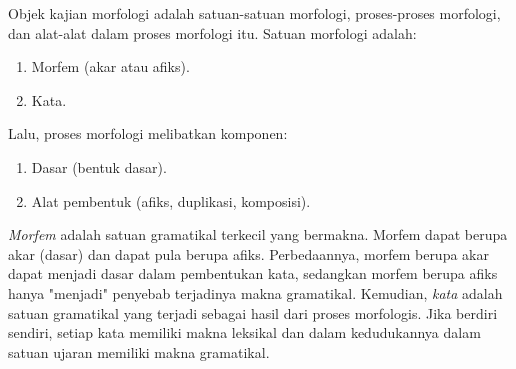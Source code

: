%
%
%
%
%
%
%
%

Objek kajian morfologi adalah satuan-satuan morfologi, proses-proses morfologi, dan alat-alat dalam proses morfologi itu\cite{chaer:08:morfologi}. Satuan morfologi adalah:

\begin{enumerate}
	\item Morfem (akar atau afiks).
	\item Kata.
\end{enumerate}

Lalu, proses morfologi melibatkan komponen:

\begin{enumerate}
	\item Dasar (bentuk dasar).
	\item Alat pembentuk (afiks, duplikasi, komposisi).
\end{enumerate}

\textit{Morfem} adalah satuan gramatikal terkecil yang bermakna. Morfem dapat berupa akar (dasar) dan dapat pula berupa afiks. Perbedaannya, morfem berupa akar dapat menjadi dasar dalam pembentukan kata, sedangkan morfem berupa afiks hanya "menjadi" penyebab terjadinya makna gramatikal. Kemudian, \textit{kata} adalah satuan gramatikal yang terjadi sebagai hasil dari proses morfologis. Jika berdiri sendiri, setiap kata memiliki makna leksikal dan dalam kedudukannya dalam satuan ujaran memiliki makna gramatikal.

